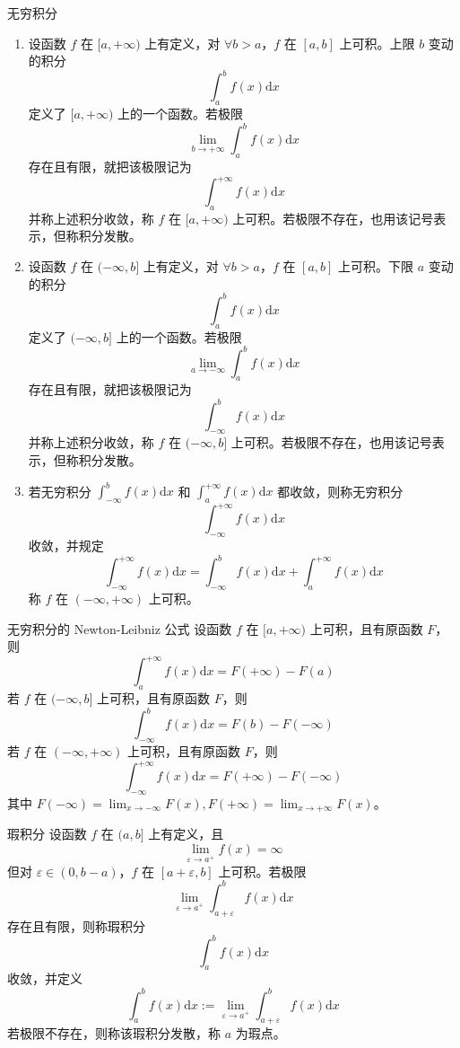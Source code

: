 \begin{definition}{无穷积分}
    \begin{enumerate}
        \item 设函数 $f$ 在 $[a, +\infty)$ 上有定义，对 $\forall b > a$，$f$ 在 $[a, b]$ 上可积。上限 $b$ 变动的积分
              \[\int_{a}^{b}f(x)\mathrm{d}x\]
              定义了 $[a, +\infty)$ 上的一个函数。若极限
              \[\lim_{b \to +\infty}\int_{a}^{b}f(x)\mathrm{d}x\]
              存在且有限，就把该极限记为
              \[\int_{a}^{+\infty}f(x)\mathrm{d}x\]
              并称上述积分收敛，称 $f$ 在 $[a,+\infty)$ 上可积。若极限不存在，也用该记号表示，但称积分发散。
        \item 设函数 $f$ 在 $(-\infty, b]$ 上有定义，对 $\forall b > a$，$f$ 在 $[a, b]$ 上可积。下限 $a$ 变动的积分
              \[\int_{a}^{b}f(x)\mathrm{d}x\]
              定义了 $(-\infty, b]$ 上的一个函数。若极限
              \[\lim_{a \to -\infty}\int_{a}^{b}f(x)\mathrm{d}x\]
              存在且有限，就把该极限记为
              \[\int_{-\infty}^{b}f(x)\mathrm{d}x\]
              并称上述积分收敛，称 $f$ 在 $(-\infty, b]$ 上可积。若极限不存在，也用该记号表示，但称积分发散。
        \item 若无穷积分 $\displaystyle \int_{-\infty}^{b}f(x)\mathrm{d}x$ 和 $\displaystyle \int_{a}^{+\infty}f(x)\mathrm{d}x$ 都收敛，则称无穷积分
              \[\int_{-\infty}^{+\infty}f(x)\mathrm{d}x\]
              收敛，并规定
              \[\int_{-\infty}^{+\infty}f(x)\mathrm{d}x = \int_{-\infty}^{b}f(x)\mathrm{d}x + \int_{a}^{+\infty}f(x)\mathrm{d}x\]
              称 $f$ 在 $(-\infty, +\infty)$ 上可积。
    \end{enumerate}
\end{definition}

\begin{theorem}{无穷积分的 Newton-Leibniz 公式}
    设函数 $f$ 在 $[a,+\infty)$ 上可积，且有原函数 $F$，则
    \[\int_{a}^{+\infty}f(x)\mathrm{d}x = F(+\infty) - F(a)\]
    若 $f$ 在 $(-\infty, b]$ 上可积，且有原函数 $F$，则
    \[\int_{-\infty}^{b}f(x)\mathrm{d}x = F(b) - F(-\infty)\]
    若 $f$ 在 $(-\infty, +\infty)$ 上可积，且有原函数 $F$，则
    \[\int_{-\infty}^{+\infty}f(x)\mathrm{d}x = F(+\infty) - F(-\infty)\]
    其中 $F(-\infty) = \lim_{x \to -\infty}F(x), F(+\infty) = \lim_{x \to +\infty}F(x)$。
\end{theorem}

\begin{definition}{瑕积分}
    设函数 $f$ 在 $(a,b]$ 上有定义，且
    \[\lim_{\varepsilon \to a^{+}}f(x) = \infty\]
    但对 $\varepsilon \in (0, b - a)$，$f$ 在 $[a + \varepsilon, b]$ 上可积。若极限
    \[\lim_{\varepsilon \to a^{+}}\int_{a + \varepsilon}^{b}f(x)\mathrm{d}x\]
    存在且有限，则称瑕积分
    \[\int_{a}^{b}f(x)\mathrm{d}x\]
    收敛，并定义
    \[\int_{a}^{b}f(x)\mathrm{d}x := \lim_{\varepsilon \to a^{+}}\int_{a + \varepsilon}^{b}f(x)\mathrm{d}x\]
    若极限不存在，则称该瑕积分发散，称 $a$ 为瑕点。
\end{definition}

